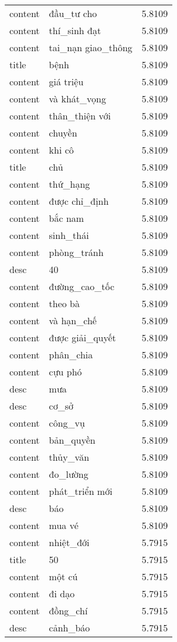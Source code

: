\documentclass{article}
\begin{document}
\begin{tabular}{lll}
content & đầu\_tư cho & 5.8109\\
content & thí\_sinh đạt & 5.8109\\
content & tai\_nạn giao\_thông & 5.8109\\
title & bệnh & 5.8109\\
content & giá triệu & 5.8109\\
content & và khát\_vọng & 5.8109\\
content & thân\_thiện với & 5.8109\\
content & chuyền & 5.8109\\
content & khi cô & 5.8109\\
title & chủ & 5.8109\\
content & thứ\_hạng & 5.8109\\
content & được chỉ\_định & 5.8109\\
content & bắc nam & 5.8109\\
content & sinh\_thái & 5.8109\\
content & phòng\_tránh & 5.8109\\
desc & 40 & 5.8109\\
content & đường\_cao\_tốc & 5.8109\\
content & theo bà & 5.8109\\
content & và hạn\_chế & 5.8109\\
content & được giải\_quyết & 5.8109\\
content & phân\_chia & 5.8109\\
content & cựu phó & 5.8109\\
desc & mưa & 5.8109\\
desc & cơ\_sở & 5.8109\\
content & công\_vụ & 5.8109\\
content & bản\_quyền & 5.8109\\
content & thủy\_văn & 5.8109\\
content & đo\_lường & 5.8109\\
content & phát\_triển mới & 5.8109\\
desc & báo & 5.8109\\
content & mua vé & 5.8109\\
content & nhiệt\_đới & 5.7915\\
title & 50 & 5.7915\\
content & một cú & 5.7915\\
content & đi dạo & 5.7915\\
content & đồng\_chí & 5.7915\\
desc & cảnh\_báo & 5.7915\\

\end{tabular}
\end{document}

